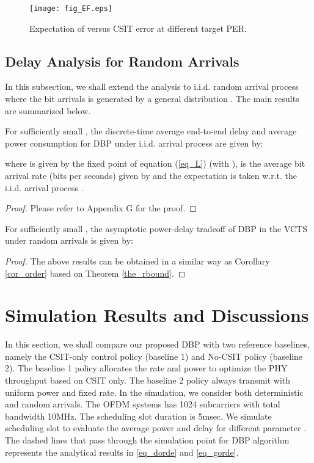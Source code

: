 \documentclass[11pt,journal, onecolumn]{./IEEEtran}
\newcommand{\blue}{\color{black}}
\newcommand{\red}{\color{black}}
\begin{document}
\begin{figure}[t!]
\centering
\texttt{[image: fig\_EF.eps]}
\caption{Expectation of  versus CSIT error  at different target PER.} \label{fig_EF}
\end{figure}

\subsection{Delay Analysis for Random Arrivals}

In this subsection, we shall extend the analysis to i.i.d. random arrival process where the bit arrivals  is generated by a general distribution . The main results are summarized below.


\begin{Theorem}\label{the_rbound}{\red For sufficiently small ,} the discrete-time average end-to-end delay  and average power consumption  for DBP  under i.i.d. arrival process  are given by:


where  is given by the fixed point of equation (\ref{eq_L}) (with ),  is the average bit arrival rate (bits per seconds) given by  and the expectation is taken w.r.t. the i.i.d. arrival process . ~\hfill\IEEEQED
\end{Theorem}
\begin{proof}
Please refer to Appendix G for the proof.
\end{proof}
\begin{Corollary}\label{cor_orderr}
{\red For sufficiently small ,} the asymptotic power-delay tradeoff of DBP {\blue in the VCTS} under random arrivals  is given by:


\end{Corollary}
\begin{proof}The above results can be obtained in a similar way as Corollary \ref{cor_order} based on Theorem \ref{the_rbound}.
\end{proof}

\section{Simulation Results and Discussions}

In this section, we shall compare our proposed DBP with two reference baselines, namely the CSIT-only control policy (baseline 1) and No-CSIT policy (baseline 2). The baseline 1 policy allocates the rate and power to optimize the PHY throughput based on CSIT only. The baseline 2 policy always transmit with uniform power and fixed rate. In the simulation, we consider both deterministic and random arrivals. The OFDM systems has 1024 subcarriers with total bandwidth 10MHz. The scheduling slot duration  is 5msec. {\red We simulate  scheduling slot to evaluate the average power and delay for different parameter . The dashed lines that pass through the simulation point for DBP algorithm represents the analytical results in \eqref{eq_dorde} and \eqref{eq_gorde}.}
\end{document}
